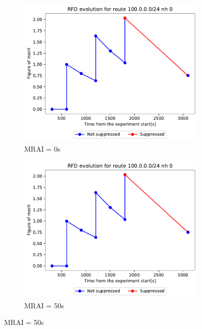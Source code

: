 \begin{figure}[h]
     \centering
     \begin{subfigure}[b]{0.49\textwidth}
         \centering
         \includegraphics[width=\textwidth]{images/RFD/clique/FigureOfMerit/mrai1_RFD_5_rfd_R1.pdf}
         \caption{MRAI = 0s}
         \label{fig:clique_5_mrai0}
     \end{subfigure}
     \hfill
     \begin{subfigure}[b]{0.49\textwidth}
         \centering
         \includegraphics[width=\textwidth]{images/RFD/clique/FigureOfMerit/mrai11_RFD_5_rfd_R1.pdf}
         \caption{MRAI = 50s}

\end{subfigure}
\end{figure}
